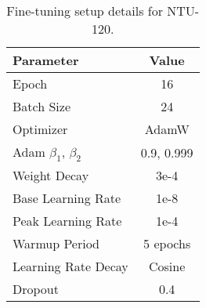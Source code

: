 \begin{table}[h]
    \centering
    \caption{Fine-tuning setup details for NTU-120.}
    \begin{tabular}{l c}
        \toprule
        \toprule
        \textbf{Parameter}            & \textbf{Value}                \\ \hline
        Epoch                         & 16                            \\ 
        Batch Size                    & 24                             \\ 
        Optimizer                     & AdamW                         \\ 
        Adam \(\beta_1\), \(\beta_2\) & 0.9, 0.999                    \\ 
        Weight Decay                  & 3e-4                          \\ 
        Base Learning Rate             & 1e-8                        \\ 
        Peak Learning Rate             & 1e-4                        \\ 
        Warmup Period                 & 5 epochs                      \\ 
        Learning Rate Decay           & Cosine                        \\ 
        Dropout                       & 0.4                           \\ \bottomrule
    \end{tabular}
    \label{tab:dt1_training_setup_ntu120}
\end{table}
\fi

